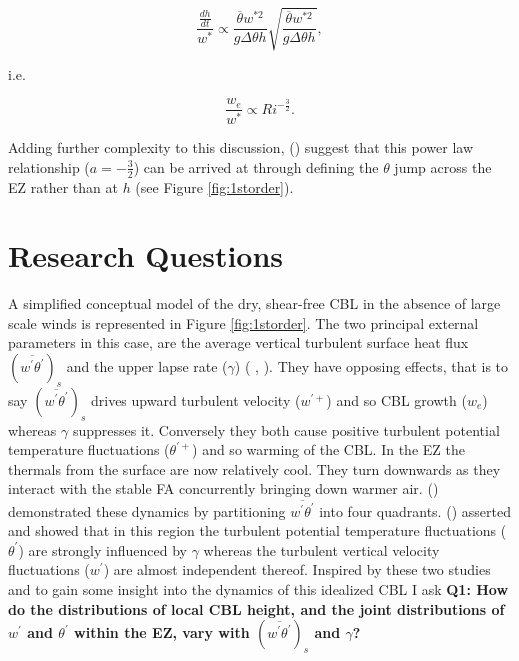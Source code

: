 \begin{equation}
\frac{\frac{dh}{dt}}{w^{*}} \propto \frac{\overline{\theta} w^{*2}}{g \Delta \theta h} \sqrt{\frac{\overline{\theta} w^{*2}}{g \Delta \theta h}},
\end{equation}

i.e.

\begin{equation}
\frac{w_{e}}{w^{*}} \propto Ri^{-\frac{3}{2}}.
\end{equation}

Adding further complexity to this discussion, \citeauthor{FedConzMir04} (\citeyear{FedConzMir04}) suggest that this power law relationship ($a = -\frac{3}{2}$) can be arrived at through defining the $\theta$ jump across the \acs{EZ} rather than at $h$ (see Figure \ref{fig:1storder}).\\


\section{Research Questions}
\label{sec:resquest}

A simplified conceptual model of the dry, shear-free \acs{CBL} in the absence of large scale winds is represented in Figure \ref{fig:1storder}.  The two principal external parameters in this case, are the average vertical turbulent surface heat flux $(\overline{w^{'}\theta^{'}})_{s}$ and the upper lapse rate ($\gamma$) (\citeauthor{FedConzMir04} \citeyear{FedConzMir04},\citeauthor{Sorbjan} \citeyear{Sorbjan}).  They have opposing effects, that is to say $(\overline{w^{'}\theta^{'}})_{s}$ drives upward turbulent velocity ($w^{'+}$) and so \acs{CBL} growth ($w_{e}$) whereas $\gamma$  suppresses it.  Conversely they both cause positive turbulent potential temperature fluctuations ($\theta^{'+}$) and so warming of the \acs{CBL}.  In the \acs{EZ} the thermals from the surface are now relatively cool.  They turn downwards as they interact with the stable \acs{FA} concurrently bringing down warmer air.  \citeauthor{SullMoengStev} (\citeyear{SullMoengStev}) demonstrated these dynamics by partitioning $\overline{w^{'} \theta^{'}}$ into four quadrants.  \citeauthor{Sorbjan} (\citeyear{Sorbjan}) asserted and showed that in this region the turbulent potential temperature fluctuations ($\theta^{'}$) are strongly influenced by $\gamma$ whereas the turbulent vertical velocity fluctuations ($w^{'}$) are almost independent thereof. Inspired by these two studies and to gain some insight into the dynamics of this idealized \acs{CBL} I ask \textbf{Q1: How do the distributions of local \acs{CBL} height, and the joint distributions of $w^{'}$ and $\theta^{'}$ within the \acs{EZ}, vary with $(\overline{w^{'}\theta^{'}})_{s}$ and $\gamma$?}\\

